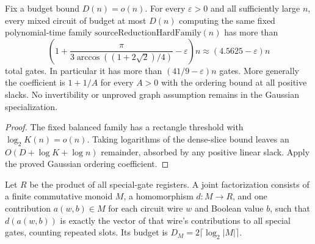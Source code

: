 \begin{theorem}
  \label{thm:lowerbounds-algebraic-aggregate-explicit}
  \leanok
  Fix a budget bound $D(n)=o(n)$. For every $\varepsilon>0$ and all sufficiently
  large $n$, every mixed circuit of budget at most $D(n)$ computing the same
  fixed polynomial-time family $\mathrm{sourceReductionHardFamily}(n)$ has
  more than
  \[
    \left(1+\frac{\pi}{3\arccos((1+2\sqrt2)/4)}-\varepsilon\right)n
    \approx(4.5625-\varepsilon)n
  \]
  total gates. In particular it has more than $(41/9-\varepsilon)n$ gates.
  More generally the coefficient is $1+1/A$ for every $A>0$ with the ordering
  bound at all positive slacks. No invertibility or unproved graph assumption
  remains in the Gaussian specialization.
\end{theorem}
\begin{proof}
  \leanok
  The fixed balanced family has a rectangle threshold with
  $\log_2 K(n)=o(n)$. Taking logarithms of the dense-slice bound leaves an
  $O(D+\log K+\log n)$ remainder, absorbed by any positive linear slack.
  Apply the proved Gaussian ordering coefficient.
\end{proof}

\begin{definition}
  \label{def:lowerbounds-algebraic-aggregate-compressed}
  \leanok
  Let $R$ be the product of all special-gate registers. A joint factorization
  consists of a finite commutative monoid $M$, a homomorphism $d:M\to R$, and
  one contribution $a(w,b)\in M$ for each circuit wire $w$ and Boolean value $b$,
  such that $d(a(w,b))$ is exactly the vector of that wire's contributions to
  all special gates, counting repeated slots. Its budget is
  $D_M=2\lceil\log_2|M|\rceil$.
\end{definition}

